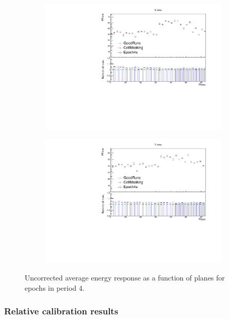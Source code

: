 \documentclass[12pt,a4paper]{article}
\begin{document}
\begin{figure}[!hbtp]
\centering
\begin{subfigure}[b]{0.495\textwidth}
\centering
\includegraphics[width=\textwidth]{Plots/Attenprofs_P4Data_PlanePE_X_Combined.pdf}
\end{subfigure}
\begin{subfigure}[b]{0.495\textwidth}
\centering
\includegraphics[width=\textwidth]{Plots/Attenprofs_P4Data_PlanePE_Y_Combined.pdf}
\end{subfigure}
\caption{Uncorrected average energy response as a function of planes for epochs in period 4.}
\label{figCalibhistPlanePE_period4}
\end{figure}

\subsubsection{Relative calibration results}
\end{document}
